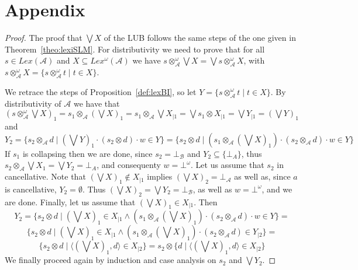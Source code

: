 \documentclass[a4paper]{elsarticle}
\newcommand{\1}{\mathbf{1}}
\begin{document}



\section*{Appendix}
\begin{proof}
	The proof that $\bigvee X$ of the LUB follows the same steps of the one given in Theorem~\ref{theo:lexiSLM}.
	For distributivity we need to prove that for all $s \in Lex(\mathcal{A})$ and 
	$X \subseteq Lex^\omega(\mathcal{A})$ we have $s \otimes^\omega_\mathcal{A} \bigvee X = \bigvee s \otimes^\omega_\mathcal{A} X$, 
	with $s \otimes^\omega_\mathcal{A} X = \{ s \otimes^\omega_\mathcal{A} t \mid t \in X\}$.
	
	We retrace the steps of Proposition~\ref{def:lexBI}, so let $Y = \{ s \otimes^\omega_\mathcal{A} t \mid t \in X\}$.
	By distributivity of $\mathcal{A}$ we have that
	$(s \otimes^\omega_\mathcal{A} \bigvee X)_1 = s_1 \otimes_\mathcal{A} (\bigvee X)_1 = s_1 \otimes_\mathcal{A} \bigvee X_{\mid 1}
	= \bigvee s_1 \otimes X_{\mid 1} =  \bigvee Y_{\mid 1} = (\bigvee Y)_1$ and
	$$Y_2 = \{ s_2 \otimes_\mathcal{A} d \mid (\bigvee Y)_{1} \cdot (s_2 \otimes d) \cdot w \in Y\}
	= \{  s_2 \otimes d \mid (s_1 \otimes_\mathcal{A} (\bigvee X)_{1}) \cdot (s_2 \otimes_\mathcal{A} d) \cdot w \in Y \}$$
	If $s_1$ is collapsing then we are done, since $s_2 = \bot_\mathcal{B}$ and $Y_2 \subseteq \{\bot_{A}\}$,
	thus $s_2 \otimes_\mathcal{A} \bigvee X_1 = 
	\bigvee Y_2 = \bot_{A}$, and consequenty $w = \bot^\omega$.
	Let us assume that $s_2$ in cancellative.
	Note that $(\bigvee X)_1 \not \in X_{\mid 1}$ implies $(\bigvee X)_2 = \bot_{\mathcal A}$ as well as, 
	since $a$ is cancellative, $Y_2 = \emptyset$.
	Thus $(\bigvee X)_2 = \bigvee Y_2 =\bot_\mathcal{B}$, as well as 
	$w = \bot^\omega$, and we are done.
	Finally, let us assume that $(\bigvee X)_1 \in X_{\mid 1}$. Then
	$$Y_2 = \{  s_2 \otimes d \mid (\bigvee X)_1 \in X_{\mid 1} \wedge (s_1 \otimes_\mathcal{A} (\bigvee X)_{1}) \cdot (s_2 \otimes_\mathcal{A} d) \cdot w \in Y \}
	=  $$
	$$\{  s_2 \otimes d \mid (\bigvee X)_1 \in X_{\mid 1} \wedge (s_1 \otimes_\mathcal{A} (\bigvee X)_{1}) \cdot (s_2 \otimes_\mathcal{A} d) \in Y _{\mid 2} \}
	=$$
	$$\{  s_2 \otimes d \mid \langle (\bigvee X)_1, d \rangle \in X _{\mid 2} \}
	= s_2 \otimes \{ d \mid \langle (\bigvee X)_1,  d \rangle \in X _{\mid 2} \}$$
	We finally proceed again by induction and case analysis on $s_2$ and $\bigvee Y_2$.
\end{proof}
\end{document}
